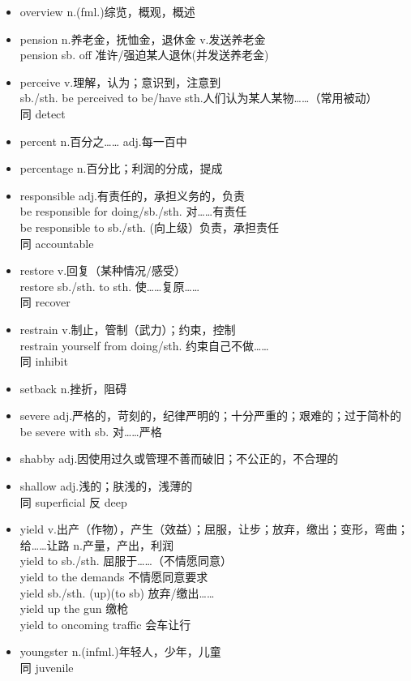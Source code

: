 \begin{multicols}{2}
\begin{itemize}
    \item overview n.(fml.)综览，概观，概述
    \item pension n.养老金，抚恤金，退休金 v.发送养老金\\pension sb. off 准许/强迫某人退休(并发送养老金)
    \item perceive v.理解，认为；意识到，注意到\\sb./sth. be perceived to be/have sth.人们认为某人某物……（常用被动）\\同 detect
    \item percent n.百分之…… adj.每一百中
    \item percentage n.百分比；利润的分成，提成
    \item responsible adj.有责任的，承担义务的，负责\\be responsible for doing/sb./sth. 对……有责任\\be responsible to sb./sth. (向上级）负责，承担责任\\同 accountable
    \item restore v.回复（某种情况/感受）\\restore sb./sth. to sth. 使……复原……\\同 recover
    \item restrain v.制止，管制（武力）；约束，控制\\restrain yourself from doing/sth. 约束自己不做……\\同 inhibit
    \item setback n.挫折，阻碍
    \item severe adj.严格的，苛刻的，纪律严明的；十分严重的；艰难的；过于简朴的\\be severe with sb. 对……严格
    \item shabby adj.因使用过久或管理不善而破旧；不公正的，不合理的
    \item shallow adj.浅的；肤浅的，浅薄的\\同 superficial 反 deep
    \item yield v.出产（作物），产生（效益）；屈服，让步；放弃，缴出；变形，弯曲；给……让路 n.产量，产出，利润\\yield to sb./sth. 屈服于……（不情愿同意）\\yield to the demands 不情愿同意要求\\yield sb./sth. (up)(to sb) 放弃/缴出……\\yield up the gun 缴枪\\yield to oncoming traffic 会车让行
    \item youngster n.(infml.)年轻人，少年，儿童\\同 juvenile
\end{itemize}
\end{multicols}
